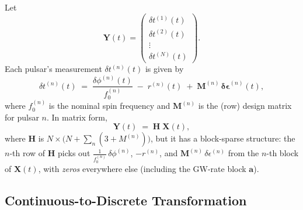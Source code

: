 \documentclass[]{scrartcl}
\begin{document}
Let
\[
\mathbf{Y}(t)
=
\begin{pmatrix}
\delta t^{(1)}(t)\\
\delta t^{(2)}(t)\\
\vdots\\
\delta t^{(N)}(t)
\end{pmatrix}.
\]
Each pulsar's measurement $\delta t^{(n)}(t)$ is given by
\[
\delta t^{(n)}(t)
\;=\;
\frac{\delta\phi^{(n)}(t)}{f_{0}^{(n)}}
\;-\;
r^{(n)}(t)
\;+\;
\mathbf{M}^{(n)}\,\boldsymbol{\delta\epsilon}^{(n)}(t),
\]
where $f_{0}^{(n)}$ is the nominal spin frequency and $\mathbf{M}^{(n)}$ is the (row) design matrix for pulsar $n$.  In matrix form,
\begin{equation}
\label{eq:meas}
\mathbf{Y}(t)
\;=\;
\mathbf{H}\;\mathbf{X}(t),
\end{equation}
where $\mathbf{H}$ is $N\times\bigl(N + \sum_{n}(3 + M^{(n)})\bigr)$, but it has a block-sparse structure:  the $n$-th row of $\mathbf{H}$ picks out $\frac{1}{f_{0}^{(n)}}\,\delta\phi^{(n)}$, $-r^{(n)}$, and $\mathbf{M}^{(n)}\,\delta\epsilon^{(n)}$ from the $n$-th block of $\mathbf{X}(t)$, with \emph{zeros} everywhere else (including the GW-rate block $\mathbf{a}$).

\subsection{Continuous-to-Discrete Transformation}
\end{document}
